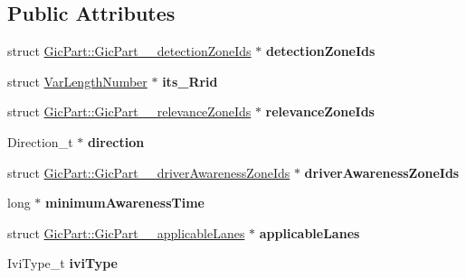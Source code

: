 \subsection*{Public Attributes}
\begin{DoxyCompactItemize}
\item 
struct \hyperlink{structGicPart_1_1GicPart____detectionZoneIds}{Gic\+Part\+::\+Gic\+Part\+\_\+\+\_\+detection\+Zone\+Ids} $\ast$ {\bfseries detection\+Zone\+Ids}\hypertarget{structGicPart_a6bcee00230d1aea79aed2f84fb0f354e}{}\label{structGicPart_a6bcee00230d1aea79aed2f84fb0f354e}

\item 
struct \hyperlink{structVarLengthNumber}{Var\+Length\+Number} $\ast$ {\bfseries its\+\_\+\+Rrid}\hypertarget{structGicPart_a4367c1cac216b699ee1c4ed080682255}{}\label{structGicPart_a4367c1cac216b699ee1c4ed080682255}

\item 
struct \hyperlink{structGicPart_1_1GicPart____relevanceZoneIds}{Gic\+Part\+::\+Gic\+Part\+\_\+\+\_\+relevance\+Zone\+Ids} $\ast$ {\bfseries relevance\+Zone\+Ids}\hypertarget{structGicPart_a870d2f6a0f83355fbbbe96f394d27ca9}{}\label{structGicPart_a870d2f6a0f83355fbbbe96f394d27ca9}

\item 
Direction\+\_\+t $\ast$ {\bfseries direction}\hypertarget{structGicPart_a2c3ee5745a64a2cd2e764c6504ec53f1}{}\label{structGicPart_a2c3ee5745a64a2cd2e764c6504ec53f1}

\item 
struct \hyperlink{structGicPart_1_1GicPart____driverAwarenessZoneIds}{Gic\+Part\+::\+Gic\+Part\+\_\+\+\_\+driver\+Awareness\+Zone\+Ids} $\ast$ {\bfseries driver\+Awareness\+Zone\+Ids}\hypertarget{structGicPart_a0c02db7c469d8c71d1fe4599679a2f94}{}\label{structGicPart_a0c02db7c469d8c71d1fe4599679a2f94}

\item 
long $\ast$ {\bfseries minimum\+Awareness\+Time}\hypertarget{structGicPart_a9089cd9f1e44c712b758bef4f7ba2b48}{}\label{structGicPart_a9089cd9f1e44c712b758bef4f7ba2b48}

\item 
struct \hyperlink{structGicPart_1_1GicPart____applicableLanes}{Gic\+Part\+::\+Gic\+Part\+\_\+\+\_\+applicable\+Lanes} $\ast$ {\bfseries applicable\+Lanes}\hypertarget{structGicPart_a9bc11125e8a349326ebc8f368fc66080}{}\label{structGicPart_a9bc11125e8a349326ebc8f368fc66080}

\item 
Ivi\+Type\+\_\+t {\bfseries ivi\+Type}\hypertarget{structGicPart_a955f8c203090c9bd75343ae20f35124c}{}\label{structGicPart_a955f8c203090c9bd75343ae20f35124c}


\end{DoxyCompactItemize}
